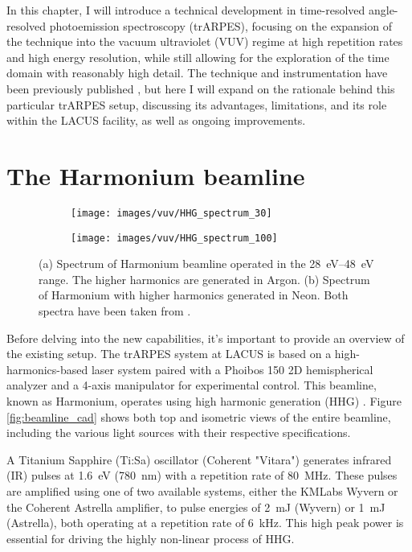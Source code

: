 In this chapter, I will introduce a technical development in time-resolved angle-resolved photoemission spectroscopy (trARPES), focusing on the expansion of the technique into the vacuum ultraviolet (VUV) regime at high repetition rates and high energy resolution, while still allowing for the exploration of the time domain with reasonably high detail.
The technique and instrumentation have been previously published \cite{hellbruck_high-resolution_2024}, but here I will expand on the rationale behind this particular trARPES setup, discussing its advantages, limitations, and its role within the LACUS facility, as well as ongoing improvements.

\section{The Harmonium beamline}

\begin{figure}
	\centering
	\begin{subfigure}[b]{0.45\textwidth}
		\texttt{[image: images/vuv/HHG\_spectrum\_30]}
		\caption{}
	\end{subfigure}
	\begin{subfigure}[b]{0.45\textwidth}
		\texttt{[image: images/vuv/HHG\_spectrum\_100]}
		\caption{}
	\end{subfigure}
	\caption{(a) Spectrum of Harmonium beamline operated in the \qtyrange{28}{48}{\electronvolt} range. The higher harmonics are generated in Argon. (b) Spectrum of Harmonium with higher harmonics generated in Neon. Both spectra have been taken from \cite{ojeda_harmonium_2015}.}
	\label{fig:hhgspectrum}
\end{figure}


Before delving into the new capabilities, it’s important to provide an overview of the existing setup.
The trARPES system at LACUS is based on a high-harmonics-based laser system paired with a Phoibos 150 2D hemispherical analyzer and a 4-axis manipulator for experimental control.
This beamline, known as Harmonium, operates using high harmonic generation (HHG) \cite{arrell_harmonium_2017}.
Figure \ref{fig:beamline_cad} shows both top and isometric views of the entire beamline, including the various light sources with their respective specifications.

A Titanium Sapphire (Ti:Sa) oscillator (Coherent "Vitara") generates infrared (IR) pulses at \qty{1.6}{\electronvolt} (\qty{780}{\nano\meter}) with a repetition rate of \qty{80}{\mega\hertz}. These pulses are amplified using one of two available systems, either the KMLabs Wyvern or the Coherent Astrella amplifier, to pulse energies of \qty{2}{\milli\joule} (Wyvern) or \qty{1}{\milli\joule} (Astrella), both operating at a repetition rate of \qty{6}{\kilo\hertz}.
This high peak power is essential for driving the highly non-linear process of HHG.

